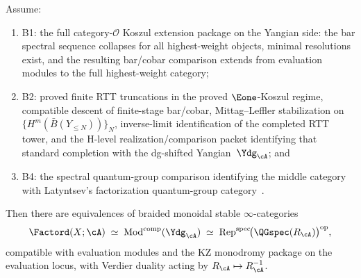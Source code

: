 \begin{theorem}
\label{thm:bridge-criterion}
Assume:
\begin{enumerate}[label=\textup{(\roman*)}]
\item \textup{B1}:
 the full category-$\mathcal{O}$ Koszul extension package on the
 Yangian side: the bar spectral sequence collapses for all
 highest-weight objects, minimal resolutions exist, and the resulting
 bar/cobar comparison extends from evaluation modules to the full
 highest-weight category;
\item \textup{B2}:
 proved finite RTT truncations in the proved $\Eone$-Koszul
 regime, compatible descent of finite-stage bar/cobar, Mittag--Leffler
 stabilization on $\{H^m(\bar B(Y_{\le N}))\}_N$, inverse-limit
 identification of the completed RTT tower, and the H-level
 realization/comparison packet identifying that standard completion
 with the dg-shifted Yangian~$\Ydg_{\cA}$; and
\item \textup{B4}:
 the spectral quantum-group comparison identifying the middle
 category with Latyntsev's factorization quantum-group
 category~\cite{Latyntsev23}.
\end{enumerate}
Then there are equivalences of braided monoidal stable
$\infty$-categories
\[
\Factord(X;\cA)
\;\simeq\;
\operatorname{Mod}^{\mathrm{comp}}(\Ydg_{\cA})
\;\simeq\;
\operatorname{Rep}^{\mathrm{spec}}\!
 \bigl(\QGspec(R_{\cA})\bigr)^{\mathrm{op}},
\]
compatible with evaluation modules and the KZ monodromy package on the
evaluation locus,
with Verdier duality acting by $R_{\cA} \mapsto R_{\cA}^{-1}$.
\end{theorem}

